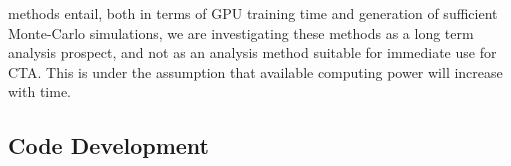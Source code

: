 methods entail, both in terms of GPU training time and generation of sufficient Monte-Carlo simulations, we are investigating these methods as a long term analysis prospect, and not as an analysis method suitable for immediate use for CTA. This is under the assumption that available computing power will increase with time.
\begin{table}[ht]
\centering
{}
\caption{Parameters used in our two datasets. In the point source run, the point source $\gamma$-rays are mixed in equal ratios with the diffuse proton and diffuse electron events. In the diffuse run, all three event classes are diffuse.}
\label{table:Datasetparams}
\end{table}

\subsection{Code Development}

